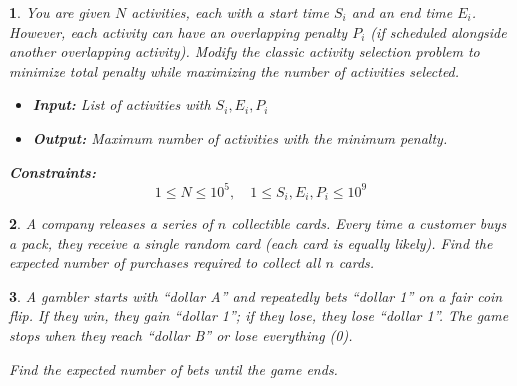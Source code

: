 \documentclass[%
addpoints]{exam}
\theoremstyle{problem}
\newtheorem{p}{}
\begin{document}
\begin{p}
You are given $N$ activities, each with a start time $S_i$ and an end time $E_i$. However, each activity can have an overlapping penalty $P_i$ (if scheduled alongside another overlapping activity). Modify the classic activity selection problem to minimize total penalty while maximizing the number of activities selected.

\begin{itemize}
    \item \textbf{Input:} List of activities with $S_i, E_i, P_i$
    \item \textbf{Output:} Maximum number of activities with the minimum penalty.
\end{itemize}

\textbf{Constraints:} 
\[
1 \leq N \leq 10^5, \quad 1 \leq S_i, E_i, P_i \leq 10^9
\]
\hfill\end{p}

\begin{p}
A company releases a series of $n$ collectible cards. Every time a customer buys a pack, they receive a single random card (each card is equally likely). Find the expected number of purchases required to collect all $n$ cards.
\hfill\end{p}

\begin{p}
A gambler starts with ``dollar A'' and repeatedly bets ``dollar 1'' on a fair coin flip. If they win, they gain ``dollar 1''; if they lose, they lose ``dollar 1''. The game stops when they reach ``dollar B'' or lose everything (0). 

Find the expected number of bets until the game ends.
\hfill\end{p}
\end{document}
